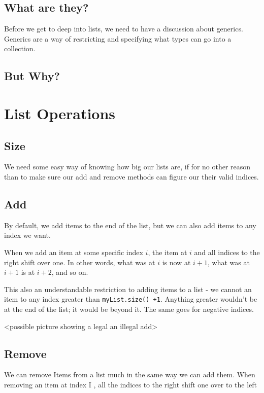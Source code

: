 \subsection{What are they?}


Before we get to deep into lists, we need to have a discussion about generics. Generics are a way of restricting and specifying what types can go into a collection.

\subsection{But Why?}




\section{List Operations}


\subsection{Size} We need some easy way of knowing how big our lists are, if for no other reason than to make sure our  add and remove methods can figure our their valid indices.


\subsection{Add}  By default, we add items to the end of the list, but we can also add items to any index we want.

When we add an item at some specific index $ i $, the item at $ i $ and all indices to the right shift over one.  In other words, what was at $ i $ is now at $ i+1 $, what was at $ i+1 $ is at $ i+2 $,  and so on.

This also an understandable restriction to adding items to a list -  we cannot an item to any index greater than \texttt{myList.size() +1}.   Anything greater wouldn't be at the end of the list; it would be beyond it.  The same goes for negative indices.
 
<possible picture showing a legal an illegal add>


\subsection{Remove}  We can remove Items from a list much in the same way we can add them. When removing an item at index I , all the indices to the right shift one over to the left 
